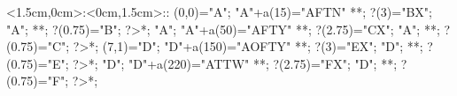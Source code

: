 %

\xy    <1.5cm,0cm>:<0cm,1.5cm>::
       (0,0)="A"; "A"+a(15)="AFTN" **\dir{}; ?(3)="BX";
       "A";  **\dir{-}; ?(0.75)="B"; ?>*\dir{>};
       "A"; "A"+a(50)="AFTY" **\dir{}; ?(2.75)="CX";
       "A";  **\dir{-}; ?(0.75)="C"; ?>*\dir{>};
%
       (7,1)="D"; "D"+a(150)="AOFTY" **\dir{}; ?(3)="EX";
       "D";  **\dir{-}; ?(0.75)="E"; ?>*\dir{>};
       "D"; "D"+a(220)="ATTW" **\dir{}; ?(2.75)="FX";
       "D";  **\dir{-}; ?(0.75)="F"; ?>*\dir{>};
       \endxy%
